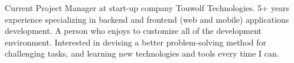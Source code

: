 
\begin{cvparagraph}

Current Project Manager at start-up company Touwolf Technologies. 5+ years experience specializing in backend and frontend (web and mobile) applications development. A person who enjoys to customize all of the development environment. Interested in devising a better problem-solving method for challenging tasks, and learning new technologies and tools every time I can.
\end{cvparagraph}
